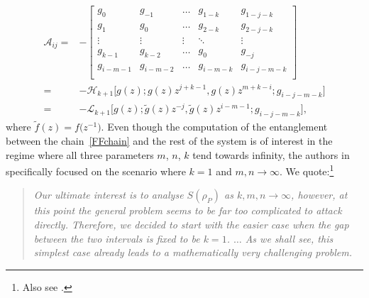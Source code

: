 \documentclass[pdftex]{sigma}
\numberwithin{equation}{section}
\begin{document}
	\begin{align*}%
			\mathscr{A}_{ij} ={}& -\begin{bmatrix}
				g_0 & g_{-1} & \dots & g_{1-k} & g_{1-j-k} \\
				g_1 & g_0 & \dots & g_{2-k} & g_{2-j-k} \\
				\vdots & \vdots & \vdots & \ddots & \vdots \\
				g_{k-1} & g_{k-2} & \dots & g_0 & g_{-j} \\
				g_{i-m-1} & g_{i-m-2} & \dots & g_{i-m-k} & g_{i-j-m-k} \\
			\end{bmatrix} \\ ={}& - \mathscr{H}_{k+1} \big[g(z); g(z) z^{j+k-1}, g(z) z^{m+k-i}; g_{i-j-m-k} \big] \\ ={}&
			- \mathscr{L}_{k+1} \big[g(z); \tilde{g}(z) z^{-j}, \tilde{g}(z) z^{i-m-1}; g_{i-j-m-k} \big],
	\end{align*}
	where $\tilde{f}(z)\! =\! f\big(z^{-1}\big)$. Even though the computation of the entanglement between the chain~\eqref{FFchain} and the rest of the system is of interest in the regime where all three parameters $m$, $n$, $k$ tend towards infinity, the authors in \cite{BGIKMMV} specifically focused on the scenario where $k=1$ and $m,n \to \infty$. We quote:\footnote{Also see \cite[Remark 1 in Section 3]{BGIKMMV}.}
\begin{quote}
		\textit{Our ultimate interest is to analyse $S(\rho_P)$ as $k,m,n\to\infty$, however, at this point the general problem seems to be far too complicated to attack directly. Therefore, we decided to start with the easier case when the gap between the two intervals is fixed to be $k=1$. $\dots$ As we shall see, this simplest case already leads to a mathematically very challenging problem.}
	\end{quote}
	
\end{document}
